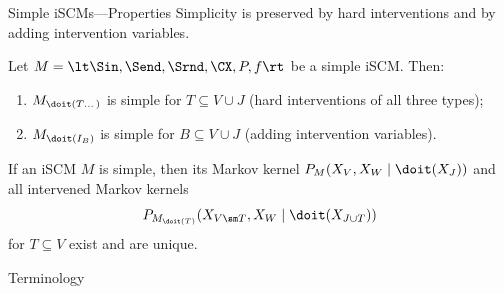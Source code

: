 \begin{frame}{Simple iSCMs---Properties}
Simplicity is preserved by hard interventions and by adding intervention variables.
\begin{Prp}[\ref{prp:scm_simplicity_preserved_by_interventions}]
  Let $M = \lt \Sin, \Send, \Srnd, \CX, P, f \rt$ be a simple iSCM. Then:
    \begin{enumerate}
      \item $M_{\doit(T\dots)}$ is simple for $T \subseteq V \cup J$ (hard interventions of all three types);
      \item $M_{\doit(I_B)}$ is simple for $B \subseteq V \cup J$ (adding intervention variables).
    \end{enumerate}
\end{Prp}
\begin{Cor}[\ref{cor:simple_scm}]
  If an iSCM $M$ is simple, then its Markov kernel $P_{M}(X_V, X_W \mid \doit(X_J))$ and all intervened Markov kernels
  $$P_{M_{\doit(T)}}(X_{V \sm T},X_W \mid \doit(X_{J \cup T}))$$
  for $T \subseteq V$ %
  exist and are unique.
\end{Cor}
\end{frame}

\begin{frame}{Terminology}
\end{frame}

